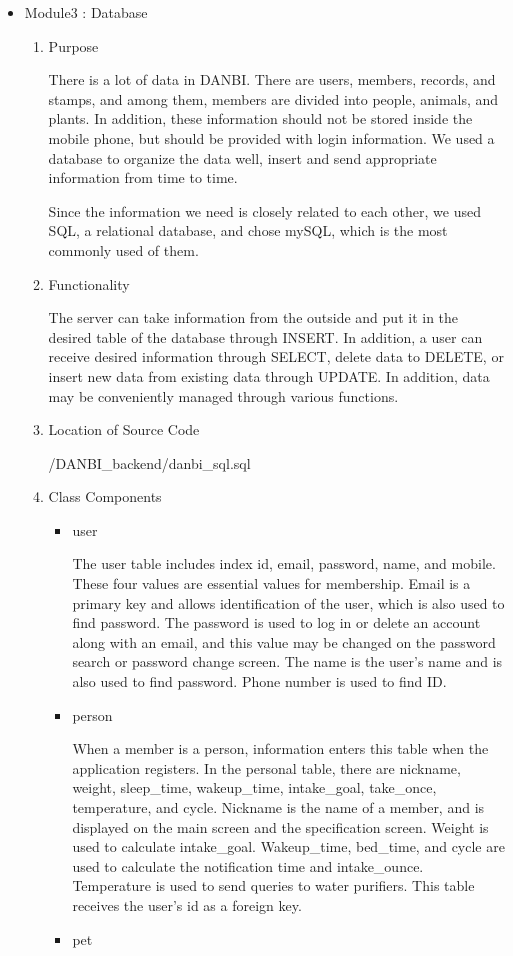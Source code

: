 \documentclass[conference]{IEEEtran}
\begin{document}
\begin{itemize}
    \item Module3 : Database
    \begin{enumerate}
    \setlength{\parindent}{2ex}
    \setlength{\parskip}{0.5em}
        \item Purpose
        
        There is a lot of data in DANBI. There are users, members, records, and stamps, and among them, members are divided into people, animals, and plants. In addition, these information should not be stored inside the mobile phone, but should be provided with login information. We used a database to organize the data well, insert and send appropriate information from time to time.

        Since the information we need is closely related to each other, we used SQL, a relational database, and chose mySQL, which is the most commonly used of them.
        \item Functionality
        
        The server can take information from the outside and put it in the desired table of the database through INSERT. In addition, a user can receive desired information through SELECT, delete data to DELETE, or insert new data from existing data through UPDATE. In addition, data may be conveniently managed through various functions.
        \item Location of Source Code
        
        /DANBI\_backend/danbi\_sql.sql
        \item Class Components
        \begin{itemize}
            \item user
            \setlength{\parindent}{2ex}
            
            The user table includes index id, email, password, name, and mobile. These four values are essential values for membership. Email is a primary key and allows identification of the user, which is also used to find password. The password is used to log in or delete an account along with an email, and this value may be changed on the password search or password change screen. The name is the user's name and is also used to find password. Phone number is used to find ID.
            \item person
            \setlength{\parindent}{2ex}
            
            When a member is a person, information enters this table when the application registers. In the personal table, there are nickname, weight, sleep\_time, wakeup\_time, intake\_goal, take\_once, temperature, and cycle. Nickname is the name of a member, and is displayed on the main screen and the specification screen. Weight is used to calculate intake\_goal. Wakeup\_time, bed\_time, and cycle are used to calculate the notification time and intake\_ounce. Temperature is used to send queries to water purifiers. This table receives the user's id as a foreign key.
            \item pet
            \setlength{\parindent}{2ex}
            

\end{itemize}
\end{enumerate}
\end{itemize}
\end{document}
